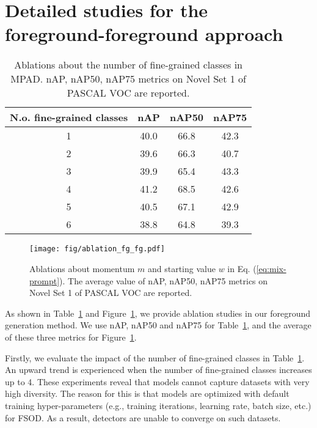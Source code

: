 \section{Detailed studies for the foreground-foreground approach}
\label{secA:ab_foreground-foreground}

\begin{table}[!h]
\centering
\begin{tabular}{c|ccc}
\toprule
N.o. fine-grained classes & nAP   & nAP50 & nAP75 \\\midrule
1 & 40.0 & 66.8 & 42.3 \\
2 & 39.6 & 66.3 & 40.7 \\
3 & 39.9 & 65.4 & 43.3\\
\rowcolor{YellowOrange!30}
4 & 41.2 & 68.5 & 42.6 \\
5 & 40.5 & 67.1 & 42.9 \\
6 & 38.8 & 64.8 & 39.3 \\
\bottomrule
\end{tabular}
\caption{Ablations about the number of  fine-grained classes in MPAD. nAP, nAP50, nAP75 metrics on Novel Set 1 of PASCAL VOC are reported.}
\label{tab:abs_fine-grained}
\end{table}



\begin{figure}[!h]
    \centering
    \texttt{[image: fig/ablation\_fg\_fg.pdf]}
    \caption{Ablations about momentum $m$ and starting value $w$ in Eq. (\ref{eq:mix-prompt}). The average value of nAP, nAP50, nAP75 metrics on Novel Set 1 of PASCAL VOC are reported.}
    \label{fig:ab_fg_sim}
\end{figure}

As shown in Table~\ref{tab:abs_fine-grained} and Figure~\ref{fig:ab_fg_sim}, we provide ablation studies in our foreground generation method. We use nAP, nAP50 and nAP75 for Table~\ref{tab:abs_fine-grained}, and the average of these three metrics for Figure~\ref{fig:ab_fg_sim}. 

Firstly, we evaluate the impact of the number of fine-grained classes in Table~\ref{tab:abs_fine-grained}. An upward trend is experienced when the number of fine-grained classes increases up to 4. These experiments reveal that models cannot capture datasets with very high diversity. The reason for this is that models are optimized with default training hyper-parameters (e.g., training iterations, learning rate, batch size, etc.) for FSOD. As a result, detectors are  unable to converge on such datasets.

